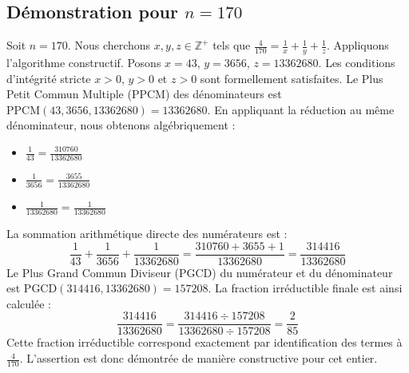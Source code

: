 \documentclass[11pt,a4paper]{article}
\begin{document}
\subsection{Démonstration pour $n = 170$}
Soit $n = 170$. Nous cherchons $x, y, z \in \mathbb{Z}^{+}$ tels que $\frac{4}{170} = \frac{1}{x} + \frac{1}{y} + \frac{1}{z}$.
Appliquons l'algorithme constructif. Posons $x = 43$, $y = 3656$, $z = 13362680$.
Les conditions d'intégrité stricte $x > 0$, $y > 0$ et $z > 0$ sont formellement satisfaites.
Le Plus Petit Commun Multiple (PPCM) des dénominateurs est $\text{PPCM}(43, 3656, 13362680) = 13362680$.
En appliquant la réduction au même dénominateur, nous obtenons algébriquement :
\begin{itemize}
    \item $\frac{1}{43} = \frac{310760}{13362680}$
    \item $\frac{1}{3656} = \frac{3655}{13362680}$
    \item $\frac{1}{13362680} = \frac{1}{13362680}$
\end{itemize}
La sommation arithmétique directe des numérateurs est :
$$ \frac{1}{43} + \frac{1}{3656} + \frac{1}{13362680} = \frac{310760 + 3655 + 1}{13362680} = \frac{314416}{13362680} $$
Le Plus Grand Commun Diviseur (PGCD) du numérateur et du dénominateur est $\text{PGCD}(314416, 13362680) = 157208$.
La fraction irréductible finale est ainsi calculée :
$$ \frac{314416}{13362680} = \frac{314416 \div 157208}{13362680 \div 157208} = \frac{2}{85} $$
Cette fraction irréductible correspond exactement par identification des termes à $\frac{4}{170}$. L'assertion est donc démontrée de manière constructive pour cet entier.
\end{document}

